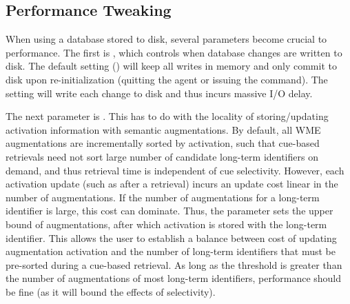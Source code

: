 \subsection{Performance Tweaking}

When using a database stored to disk, several parameters become crucial to performance.
The first is , which controls when database changes are written to disk.
The default setting () will keep all writes in memory and only commit to disk upon re-initialization (quitting the agent or issuing the  command).
The  setting will write each change to disk and thus incurs massive I/O delay.

The next parameter is .
This has to do with the locality of storing/updating activation information with semantic augmentations.
By default, all WME augmentations are incrementally sorted by activation, such that cue-based retrievals need not sort large number of candidate long-term identifiers on demand, and thus retrieval time is independent of cue selectivity.
However, each activation update (such as after a retrieval) incurs an update cost linear in the number of augmentations.
If the number of augmentations for a long-term identifier is large, this cost can dominate.
Thus, the  parameter sets the upper bound of augmentations, after which activation is stored with the long-term identifier.
This allows the user to establish a balance between cost of updating augmentation activation and the number of long-term identifiers that must be pre-sorted during a cue-based retrieval.
As long as the threshold is greater than the number of augmentations of most long-term identifiers, performance should be fine (as it will bound the effects of selectivity).


